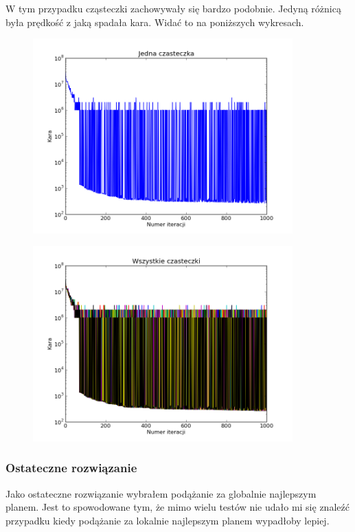 \par W tym przypadku cząsteczki zachowywały się bardzo podobnie. Jedyną różnicą była prędkość z jaką spadała kara. Widać to na poniższych wykresach. 
\begin{figure}[H]
\includegraphics[width=10cm]{img/globalbest_particle.png}
\centering
\end{figure}
\begin{figure}[H]
\includegraphics[width=10cm]{img/globalbest_particle_all.png}
\centering
\end{figure}
\subsubsection{Ostateczne rozwiązanie}
\par Jako ostateczne rozwiązanie wybrałem podążanie za globalnie najlepszym planem. Jest to spowodowane tym, że mimo wielu testów nie udało mi się znaleźć przypadku kiedy podążanie za lokalnie najlepszym planem wypadłoby lepiej. 
